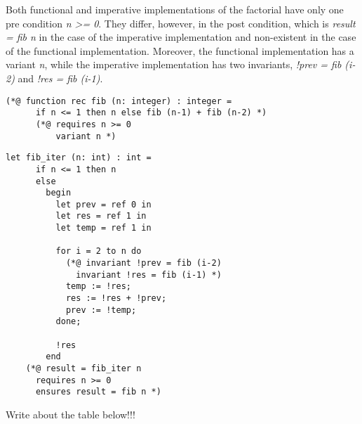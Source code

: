  Both functional and imperative implementations of the factorial have only one pre condition \emph{n >= 0}.
  They differ, however, in the post condition, which is \emph{result = fib n} in the case of the imperative implementation and non-existent in the case of the functional implementation.
  Moreover, the functional implementation has a variant \emph{n}, while the imperative implementation has two invariants, \emph{!prev = fib (i-2)} and \emph{!res = fib (i-1)}. 

  \begin{lstlisting}[language=caml, caption={Functional fibonacci implementation},captionpos=b]
    (*@ function rec fib (n: integer) : integer =
	  if n <= 1 then n else fib (n-1) + fib (n-2) *)
	  (*@ requires n >= 0 
		  variant n *)
  \end{lstlisting}


  \begin{lstlisting}[language=caml, caption={Imperative fibonacci implementation},captionpos=b]
    let fib_iter (n: int) : int =
      if n <= 1 then n
      else
        begin
          let prev = ref 0 in 
          let res = ref 1 in
          let temp = ref 1 in

          for i = 2 to n do
            (*@ invariant !prev = fib (i-2)
              invariant !res = fib (i-1) *)
            temp := !res;
            res := !res + !prev;
            prev := !temp;
          done;

          !res
        end
    (*@ result = fib_iter n
      requires n >= 0 
      ensures result = fib n *)
  \end{lstlisting}

  Write about the table below!!!

